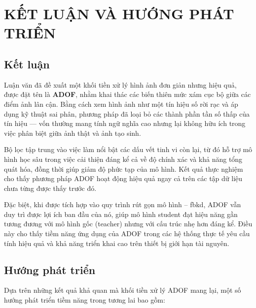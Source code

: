 \chapter{KẾT LUẬN VÀ HƯỚNG PHÁT TRIỂN}

\section{Kết luận}
Luận văn đã đề xuất một khối tiền xử lý hình ảnh đơn giản nhưng hiệu quả, được đặt tên là \textbf{ADOF}, nhằm khai thác các biến thiên mức xám cục bộ giữa các điểm ảnh lân cận. Bằng cách xem hình ảnh như một tín hiệu số rời rạc và áp dụng kỹ thuật sai phân, phương pháp đã loại bỏ các thành phần tần số thấp của tín hiệu — vốn thường mang tính ngữ nghĩa cao nhưng lại không hữu ích trong việc phân biệt giữa ảnh thật và ảnh tạo sinh.

Bộ lọc tập trung vào việc làm nổi bật các dấu vết tinh vi còn lại, từ đó hỗ trợ mô hình học sâu trong việc cải thiện đáng kể cả về độ chính xác và khả năng tổng quát hóa, đồng thời giúp giảm độ phức tạp của mô hình. Kết quả thực nghiệm cho thấy phương pháp ADOF hoạt động hiệu quả ngay cả trên các tập dữ liệu chưa từng được thấy trước đó.

Đặc biệt, khi được tích hợp vào quy trình rút gọn mô hình -- \gls{fbkd}, ADOF vẫn duy trì được lợi ích ban đầu của nó, giúp mô hình \gls{student} đạt hiệu năng gần tương đương với mô hình gốc (\gls{teacher}) nhưng với cấu trúc nhẹ hơn đáng kể. Điều này cho thấy tiềm năng ứng dụng của ADOF trong các hệ thống thực tế yêu cầu tính hiệu quả và khả năng triển khai cao trên thiết bị giới hạn tài nguyên.

\section{Hướng phát triển}
Dựa trên những kết quả khả quan mà khối tiền xử lý ADOF mang lại, một số hướng phát triển tiềm năng trong tương lai bao gồm:

